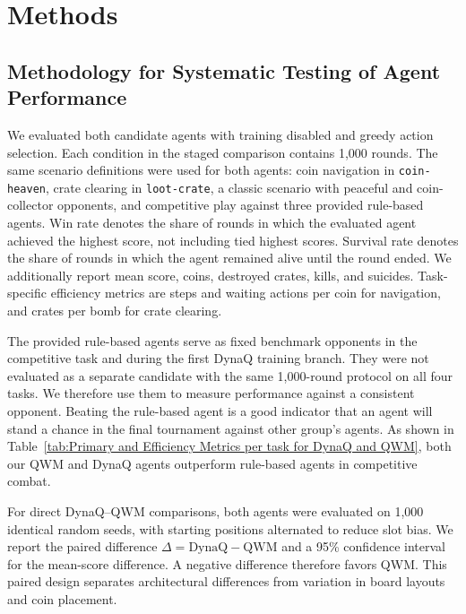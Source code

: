 \documentclass[article, 10pt]{IEEEtran}
\begin{document}
\section{Methods}\label{sec:4_methods}

\subsection{Methodology for Systematic Testing of Agent Performance}\label{sec:evaluation_methodology}
We evaluated both candidate agents with training disabled and greedy action selection. Each condition in the staged comparison contains 1,000 rounds. The same scenario definitions were used for both agents: coin navigation in \texttt{coin-heaven}, crate clearing in \texttt{loot-crate}, a classic scenario with peaceful and coin-collector opponents, and competitive play against three provided rule-based agents. Win rate denotes the share of rounds in which the evaluated agent achieved the highest score, not including tied highest scores. Survival rate denotes the share of rounds in which the agent remained alive until the round ended. We additionally report mean score, coins, destroyed crates, kills, and suicides. Task-specific efficiency metrics are steps and waiting actions per coin for navigation, and crates per bomb for crate clearing.

The provided rule-based agents serve as fixed benchmark opponents in the competitive task and during the first DynaQ training branch. They were not evaluated as a separate candidate with the same 1,000-round protocol on all four tasks. We therefore use them to measure performance against a consistent opponent. Beating the rule-based agent is a good indicator that an agent will stand a chance in the final tournament against other group's agents. As shown in Table~\ref{tab:Primary and Efficiency Metrics per task for DynaQ and QWM}, both our QWM and DynaQ agents outperform rule-based agents in competitive combat.

For direct DynaQ--QWM comparisons, both agents were evaluated on 1,000 identical random seeds, with starting positions alternated to reduce slot bias. We report the paired difference $\Delta=\mathrm{DynaQ}-\mathrm{QWM}$ and a 95\% confidence interval for the mean-score difference. A negative difference therefore favors QWM. This paired design separates architectural differences from variation in board layouts and coin placement.
\end{document}
